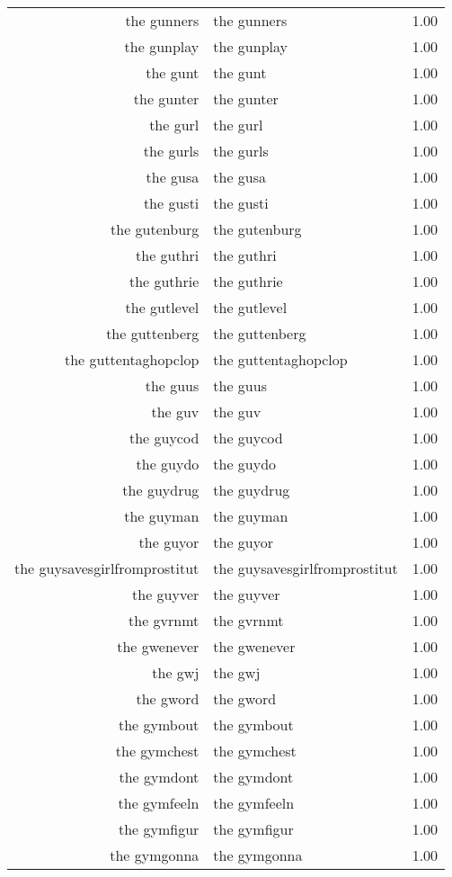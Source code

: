\begin{table}[ht]
\begin{tabular}{rlr}
  the gunners & the gunners & 1.00 \\ 
  the gunplay & the gunplay & 1.00 \\ 
  the gunt & the gunt & 1.00 \\ 
  the gunter & the gunter & 1.00 \\ 
  the gurl & the gurl & 1.00 \\ 
  the gurls & the gurls & 1.00 \\ 
  the gusa & the gusa & 1.00 \\ 
  the gusti & the gusti & 1.00 \\ 
  the gutenburg & the gutenburg & 1.00 \\ 
  the guthri & the guthri & 1.00 \\ 
  the guthrie & the guthrie & 1.00 \\ 
  the gutlevel & the gutlevel & 1.00 \\ 
  the guttenberg & the guttenberg & 1.00 \\ 
  the guttentaghopclop & the guttentaghopclop & 1.00 \\ 
  the guus & the guus & 1.00 \\ 
  the guv & the guv & 1.00 \\ 
  the guycod & the guycod & 1.00 \\ 
  the guydo & the guydo & 1.00 \\ 
  the guydrug & the guydrug & 1.00 \\ 
  the guyman & the guyman & 1.00 \\ 
  the guyor & the guyor & 1.00 \\ 
  the guysavesgirlfromprostitut & the guysavesgirlfromprostitut & 1.00 \\ 
  the guyver & the guyver & 1.00 \\ 
  the gvrnmt & the gvrnmt & 1.00 \\ 
  the gwenever & the gwenever & 1.00 \\ 
  the gwj & the gwj & 1.00 \\ 
  the gword & the gword & 1.00 \\ 
  the gymbout & the gymbout & 1.00 \\ 
  the gymchest & the gymchest & 1.00 \\ 
  the gymdont & the gymdont & 1.00 \\ 
  the gymfeeln & the gymfeeln & 1.00 \\ 
  the gymfigur & the gymfigur & 1.00 \\ 
  the gymgonna & the gymgonna & 1.00 \\ 

\end{tabular}
\end{table}
